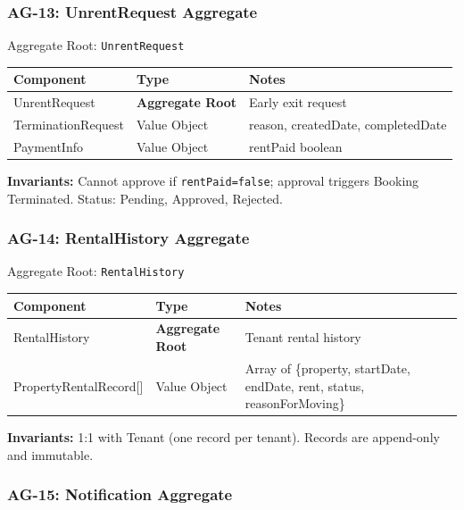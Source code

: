 \documentclass[12pt,a4paper]{article}
\begin{document}
\subsubsection{AG-13: UnrentRequest Aggregate}

\begin{infobox}{Aggregate Root: \texttt{UnrentRequest}}
\begin{tabular}{@{}p{3cm}p{2.8cm}p{7.8cm}@{}}
\textbf{Component} & \textbf{Type} & \textbf{Notes} \\
\hline
UnrentRequest & \textbf{Aggregate Root} & Early exit request \\
TerminationRequest & Value Object & reason, createdDate, completedDate \\
PaymentInfo & Value Object & rentPaid boolean \\
\end{tabular}

\textbf{Invariants:} Cannot approve if \texttt{rentPaid=false}; approval triggers Booking Terminated. Status: Pending, Approved, Rejected.
\end{infobox}

\subsubsection{AG-14: RentalHistory Aggregate}

\begin{infobox}{Aggregate Root: \texttt{RentalHistory}}
\begin{tabular}{@{}p{3cm}p{2.8cm}p{7.8cm}@{}}
\textbf{Component} & \textbf{Type} & \textbf{Notes} \\
\hline
RentalHistory & \textbf{Aggregate Root} & Tenant rental history \\
PropertyRentalRecord[] & Value Object & Array of \{property, startDate, endDate, rent, status, reasonForMoving\} \\
\end{tabular}

\textbf{Invariants:} 1:1 with Tenant (one record per tenant). Records are append-only and immutable.
\end{infobox}

\subsubsection{AG-15: Notification Aggregate}
\end{document}
